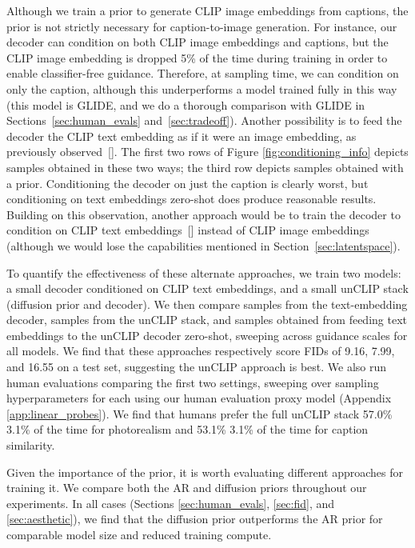 \documentclass{article}
\newcommand{\shortcite}[1]{[\citenum{#1}]}
\newcommand{\modelname}{unCLIP}
\begin{document}
Although we train a prior to generate CLIP image embeddings from captions, the prior is not strictly necessary for caption-to-image generation. For instance, our decoder can condition on both CLIP image embeddings and captions, but the CLIP image embedding is dropped 5\% of the time during training in order to enable classifier-free guidance. Therefore, at sampling time, we can condition on only the caption, although this underperforms a model trained fully in this way (this model is GLIDE, and we do a thorough comparison with GLIDE in Sections~\ref{sec:human_evals} and~\ref{sec:tradeoff}). Another possibility is to feed the decoder the CLIP text embedding as if it were an image embedding, as previously observed~\shortcite{lafite,clipgen}. The first two rows of Figure \ref{fig:conditioning_info} depicts samples obtained in these two ways; the third row depicts samples obtained with a prior. Conditioning the decoder on just the caption is clearly worst, but conditioning on text embeddings zero-shot does produce reasonable results. Building on this observation, another approach would be to train the decoder to condition on CLIP text embeddings~\shortcite{vdiffusion} instead of CLIP image embeddings (although we would lose the capabilities mentioned in Section~\ref{sec:latentspace}).

To quantify the effectiveness of these alternate approaches, we train two models: a small decoder conditioned on CLIP text embeddings, and a small \modelname{} stack (diffusion prior and decoder). We then compare samples from the text-embedding decoder, samples from the \modelname{} stack, and samples obtained from feeding text embeddings to the \modelname{} decoder zero-shot, sweeping across guidance scales for all models. We find that these approaches respectively score FIDs of 9.16, 7.99, and 16.55 on a test set, suggesting the \modelname{} approach is best. We also run human evaluations comparing the first two settings, sweeping over sampling hyperparameters for each using our human evaluation proxy model (Appendix \ref{app:linear_probes}). We find that humans prefer the full \modelname{} stack 57.0\%  3.1\% of the time for photorealism and 53.1\%  3.1\% of the time for caption similarity.

Given the importance of the prior, it is worth evaluating different approaches for training it. We compare both the AR and diffusion priors throughout our experiments. In all cases (Sections \ref{sec:human_evals}, \ref{sec:fid}, and \ref{sec:aesthetic}), we find that the diffusion prior outperforms the AR prior for comparable model size and reduced training compute.
\end{document}
